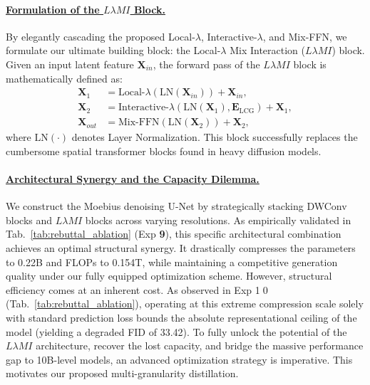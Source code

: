 \documentclass{llmxive}
\begin{document}
\paragraph{\underline{Formulation of the \texorpdfstring{$L\lambda MI$}{L MI} Block.}}
By elegantly cascading the proposed Local-$\lambda$, Interactive-$\lambda$, and Mix-FFN, we formulate our ultimate building block: the Local-$\lambda$ Mix Interaction ($L\lambda MI$) block. Given an input latent feature $\mathbf{X}_{in}$, the forward pass of the $L\lambda MI$ block is mathematically defined as:
\begin{equation}
\begin{aligned}
\mathbf{X}_1 &= \text{Local-}\lambda(\text{LN}(\mathbf{X}_{in})) + \mathbf{X}_{in}, \\
\mathbf{X}_2 &= \text{Interactive-}\lambda(\text{LN}(\mathbf{X}_1), \mathbf{E}_\text{LCG}) + \mathbf{X}_1, \\
\mathbf{X}_{out} &= \text{Mix-FFN}(\text{LN}(\mathbf{X}_2)) + \mathbf{X}_2,
\end{aligned}
\end{equation}
where $\text{LN}(\cdot)$ denotes Layer Normalization. This block successfully replaces the cumbersome spatial transformer blocks found in heavy diffusion models. 

\vspace{-0.5em}
\paragraph{\underline{Architectural Synergy and the Capacity Dilemma.}}\label{para:Architectural_Synergy_and_Capacity_Dilemma}
We construct the Moebius denoising U-Net by strategically stacking DWConv blocks and $L\lambda MI$ blocks across varying resolutions. As empirically validated in Tab.~\ref{tab:rebuttal_ablation} (Exp \textcircled{\small \textbf{9}}), this specific architectural combination achieves an optimal structural synergy. It drastically compresses the parameters to 0.22B and FLOPs to 0.154T, while maintaining a competitive generation quality under our fully equipped optimization scheme. 
\indent However, structural efficiency comes at an inherent cost. As observed in Exp \textcircled{\scriptsize 10} (Tab.~\ref{tab:rebuttal_ablation}), operating at this extreme compression scale solely with standard prediction loss bounds the absolute representational ceiling of the model (yielding a degraded FID of 33.42). To fully unlock the potential of the $L\lambda MI$ architecture, recover the lost capacity, and bridge the massive performance gap to 10B-level models, an advanced optimization strategy is imperative. This motivates our proposed multi-granularity distillation.
\end{document}

